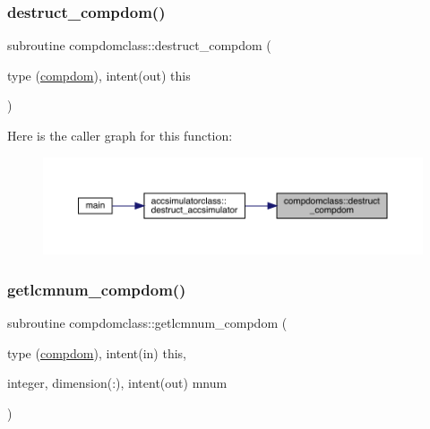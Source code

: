 \subsubsection{\texorpdfstring{destruct\_compdom()}{destruct\_compdom()}}
{\footnotesize\ttfamily subroutine compdomclass\+::destruct\+\_\+compdom (\begin{DoxyParamCaption}\item[{type (\mbox{\hyperlink{namespacecompdomclass_structcompdomclass_1_1compdom}{compdom}}), intent(out)}]{this }\end{DoxyParamCaption})}

Here is the caller graph for this function\+:\nopagebreak
\begin{figure}[H]
\begin{center}
\leavevmode
\includegraphics[width=350pt]{namespacecompdomclass_ae220a1544909bd8851faed61ce9ad7b8_icgraph}
\end{center}
\end{figure}
\mbox{\label{namespacecompdomclass_a545b0a4e8dce9ec9c326806ed1b36598}} 
\subsubsection{\texorpdfstring{getlcmnum\_compdom()}{getlcmnum\_compdom()}}
{\footnotesize\ttfamily subroutine compdomclass\+::getlcmnum\+\_\+compdom (\begin{DoxyParamCaption}\item[{type (\mbox{\hyperlink{namespacecompdomclass_structcompdomclass_1_1compdom}{compdom}}), intent(in)}]{this,  }\item[{integer, dimension(\+:), intent(out)}]{mnum }\end{DoxyParamCaption})}

